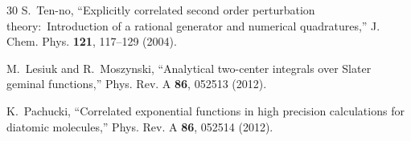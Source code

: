 \documentclass[aps,pra,twocolumn,superscriptaddress,longbibliography]{revtex4-2}
\begin{document}
\begin{thebibliography}{30}
S.~Ten-no,
``Explicitly correlated second order perturbation theory:\ Introduction of
a rational generator and numerical quadratures,''
J. Chem. Phys. \textbf{121}, 117--129 (2004).

M.~Lesiuk and R.~Moszynski,
``Analytical two-center integrals over Slater geminal functions,''
Phys. Rev. A \textbf{86}, 052513 (2012).

K.~Pachucki,
``Correlated exponential functions in high precision calculations for
diatomic molecules,''
Phys. Rev. A \textbf{86}, 052514 (2012).

\end{thebibliography}
\end{document}
